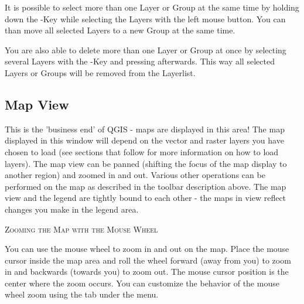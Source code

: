 It is possible to select more than one Layer or Group at the same time 
by holding down the -Key while selecting the Layers with the 
left mouse button. You can than move all selected Layers to a new Group at 
the same time.

You are also able to delete more than one Layer or Group at once by selecting 
several Layers with the -Key and pressing  afterwards.
This way all selected Layers or Groups will be removed from the Layerlist.

%

\subsection{Map View}\label{label_mapview}

This is the 'business end' of QGIS - maps are displayed in this area! The
map displayed in this window will depend on the vector and raster layers you
have chosen to load (see sections that follow for more information on how to
load layers). The map view can be panned (shifting the focus of the map display
to another region) and zoomed in and out. Various other operations can be
performed on the map as described in the toolbar description above.  The map
view and the legend are tightly bound to each other - the maps in view reflect
changes you make in the legend area.

\begin{Tip}\caption{\textsc{Zooming the Map with the Mouse
Wheel}}
You can use the mouse wheel to zoom in and out on the map. Place
the mouse cursor inside the map area and roll the wheel forward (away from you) to
zoom in and backwards (towards you) to zoom out. The mouse cursor position is the
center where the zoom occurs. You can customize the behavior of the mouse
wheel zoom using the  tab under the  \arrow
{} menu.
\end{Tip}

